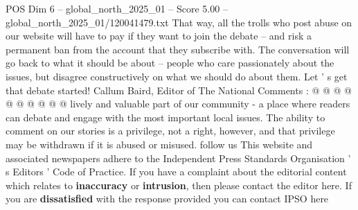 \begin{textsample}{POS Dim 6 – global\_north\_2025\_01 – Score 5.00 – global\_north\_2025\_01/120041479.txt}
That way, all the trolls who post abuse on our website will have to pay if they want to join the debate -- and risk a permanent ban from the account that they subscribe with.
The conversation will go back to what it should be about -- people who care passionately about the issues, but disagree constructively on what we should do about them.
Let ' s get that debate started!
Callum Baird, Editor of The National Comments : @ @ @ @ @ @ @ @ @ @ lively and valuable part of our community - a place where readers can debate and engage with the most important local issues.
The ability to comment on our stories is a privilege, not a right, however, and that privilege may be withdrawn if it is abused or misused. follow us This website and associated newspapers adhere to the Independent Press Standards Organisation ' s Editors ' Code of Practice.
If you have a complaint about the editorial content which relates to \textbf{inaccuracy} or \textbf{intrusion}, then please contact the editor here.
If you are \textbf{dissatisfied} with the response provided you can contact IPSO here

\end{textsample}
